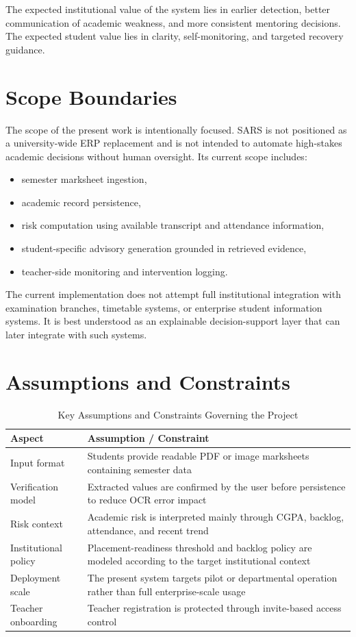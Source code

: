 The expected institutional value of the system lies in earlier detection, better communication of academic weakness, and more consistent mentoring decisions. The expected student value lies in clarity, self-monitoring, and targeted recovery guidance.

\section{Scope Boundaries}
The scope of the present work is intentionally focused. SARS is not positioned as a university-wide ERP replacement and is not intended to automate high-stakes academic decisions without human oversight. Its current scope includes:
\begin{itemize}[leftmargin=*]
\item semester marksheet ingestion,
\item academic record persistence,
\item risk computation using available transcript and attendance information,
\item student-specific advisory generation grounded in retrieved evidence,
\item teacher-side monitoring and intervention logging.
\end{itemize}

The current implementation does not attempt full institutional integration with examination branches, timetable systems, or enterprise student information systems. It is best understood as an explainable decision-support layer that can later integrate with such systems.

\section{Assumptions and Constraints}
\begin{table}[H]
\centering
\caption{Key Assumptions and Constraints Governing the Project}
\begin{tabularx}{\textwidth}{>{\raggedright\arraybackslash}p{} >{\raggedright\arraybackslash}X}
\toprule
\textbf{Aspect} & \textbf{Assumption / Constraint} \\
\midrule
Input format & Students provide readable PDF or image marksheets containing semester data \\
Verification model & Extracted values are confirmed by the user before persistence to reduce OCR error impact \\
Risk context & Academic risk is interpreted mainly through CGPA, backlog, attendance, and recent trend \\
Institutional policy & Placement-readiness threshold and backlog policy are modeled according to the target institutional context \\
Deployment scale & The present system targets pilot or departmental operation rather than full enterprise-scale usage \\
Teacher onboarding & Teacher registration is protected through invite-based access control \\
\bottomrule
\end{tabularx}
\end{table}

